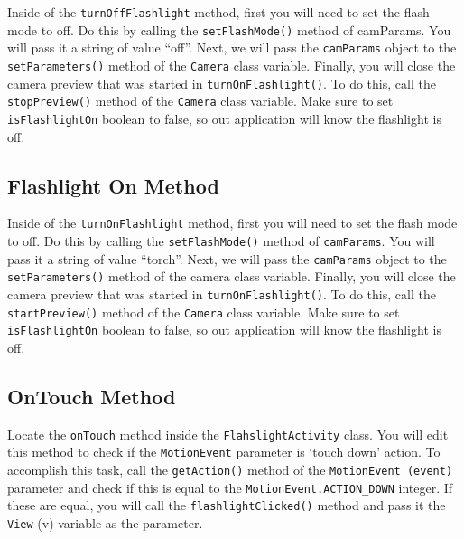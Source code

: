 Inside of the \verb=turnOffFlashlight= method, first you will need to set the flash mode to off.
Do this by calling the \verb=setFlashMode()= method of camParams.
You will pass it a string of value “off”.
Next, we will pass the \verb=camParams= object to the \verb=setParameters()= method of the \verb=Camera= class variable.
Finally, you will close the camera preview that was started in \verb=turnOnFlashlight()=.
To do this, call the \verb=stopPreview()= method of the \verb=Camera= class variable. 
Make sure to set \verb=isFlashlightOn= boolean to false, so out application will know the flashlight is off.

\subsection{Flashlight On Method}
Inside of the \verb=turnOnFlashlight= method, first you will need to set the flash mode to off.
Do this by calling the \verb=setFlashMode()= method of \verb=camParams=.
You will pass it a string of value “torch”.
Next, we will pass the \verb=camParams= object to the \verb=setParameters()= method of the camera class variable.
Finally, you will close the camera preview that was started in \verb=turnOnFlashlight()=.
To do this, call the \verb=startPreview()= method of the \verb=Camera= class variable.
Make sure to set \verb=isFlashlightOn= boolean to false, so out application will know the flashlight is off.

\subsection{OnTouch Method}
Locate the \verb=onTouch= method inside the \verb=FlahslightActivity= class.
You will edit this method to check if the \verb=MotionEvent= parameter is ‘touch down’ action.
To accomplish this task, call the \verb=getAction()= method of the \verb=MotionEvent (event)= parameter and check if this is equal to the \verb=MotionEvent.ACTION_DOWN= integer.
If these are equal, you will call the \verb=flashlightClicked()= method and pass it the \verb=View= (v) variable as the parameter.



